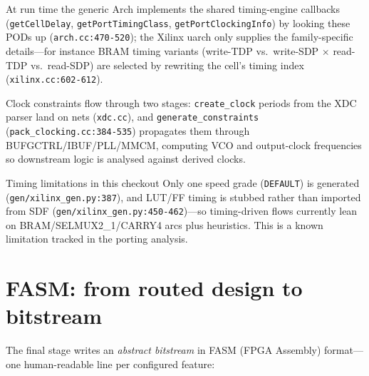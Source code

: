 \documentclass[11pt,a4paper]{article}
\begin{document}
At run time the generic Arch implements the shared timing-engine
callbacks (\texttt{getCellDelay}, \texttt{getPortTimingClass},
\allowbreak\texttt{getPortClockingInfo}) by looking these PODs up
(\texttt{arch.cc:470-520}); the Xilinx uarch only supplies the
family-specific details---for instance BRAM timing variants (write-TDP
vs.\ write-SDP $\times$ read-TDP vs.\ read-SDP) are selected by
rewriting the cell's timing index (\texttt{xilinx.cc:602-612}).

Clock constraints flow through two stages: \texttt{create\_clock}
periods from the XDC parser land on nets (\texttt{xdc.cc}), and
\texttt{generate\_constraints} (\texttt{pack\_clocking.cc:384-535})
propagates them through BUFGCTRL/IBUF/PLL/MMCM, computing VCO and
output-clock frequencies so downstream logic is analysed against
derived clocks.

\begin{warnbox}{Timing limitations in this checkout}
Only one speed grade (\texttt{DEFAULT}) is generated
(\texttt{gen/xilinx\_gen.py:387}), and LUT/FF timing is stubbed rather
than imported from SDF (\texttt{gen/xilinx\_gen.py:450-462})---so
timing-driven flows currently lean on BRAM/SELMUX2\_1/CARRY4 arcs plus
heuristics. This is a known limitation tracked in the porting analysis.
\end{warnbox}

\section{FASM: from routed design to bitstream}

The final stage writes an \emph{abstract bitstream} in FASM (FPGA
Assembly) format---one human-readable line per configured feature:
\end{document}
